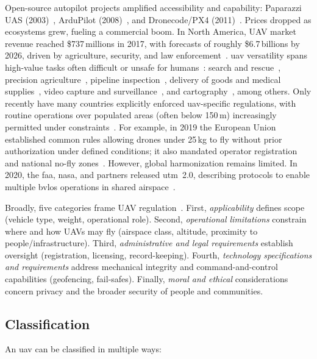 Open-source autopilot projects amplified accessibility and capability:
Paparazzi UAS (2003)~\cite{paparazzi-home}, ArduPilot (2008)~\cite{arduPilotHistory},
and Dronecode/PX4 (2011)~\cite{px4History}. Prices dropped as ecosystems grew,
fueling a commercial boom. In North America, UAV market revenue reached
\$737\,millions in 2017, with forecasts of roughly \$6.7\,billions by 2026, driven by
agriculture, security, and law enforcement~\cite{mohsan2022towards}.
%
\gls{uav} versatility spans high-value tasks often difficult or unsafe for humans~\cite{silvagni_multipurpose_2017,lammers_airborne_2023}:
search and rescue~\cite{silvagni_multipurpose_2017}, precision
agriculture~\cite{tsouros_review_2019}, pipeline inspection~\cite{yu_uav-based_2022},
delivery of goods and medical supplies~\cite{lammers_airborne_2023}, video capture and
surveillance~\cite{dilshad_applications_2020}, and cartography~\cite{caroti_uav-borne_2017}, among others.
%
Only recently have many countries explicitly enforced \gls{uav}-specific regulations,
with routine operations over populated areas (often below 150\,m) increasingly
permitted under constraints~\cite{nassi2021sok}. For example, in 2019 the
European Union
established common rules allowing drones under 25\,kg to fly without prior
authorization under defined conditions; it also mandated operator registration
and national no-fly zones~\cite{Ullah2020UAV5gEULegisl}. However, global harmonization
remains limited. In 2020, the \gls{faa}, \gls{nasa}, and partners released
\gls{utm}~2.0, describing protocols to enable multiple \gls{bvlos} operations in
shared airspace~\cite{glossner2021overview}.

Broadly, five categories frame UAV regulation~\cite{fotouhi2019UAVCellularCommSurvey,stocker2017UAVRegulationsReview}.
First, \emph{applicability} defines scope (vehicle type, weight, operational
role). Second, \emph{operational limitations} constrain where and how UAVs may
fly (airspace class, altitude, proximity to people/infrastructure). Third,
\emph{administrative and legal requirements} establish oversight (registration,
licensing, record-keeping). Fourth, \emph{technology specifications and
requirements} address mechanical integrity and command-and-control capabilities
(geofencing, fail-safes). Finally, \emph{moral and ethical} considerations
concern privacy and the broader security of people and communities.



\subsection{Classification}%
\label{sec:classification}
An \gls{uav} can be classified in multiple ways:

